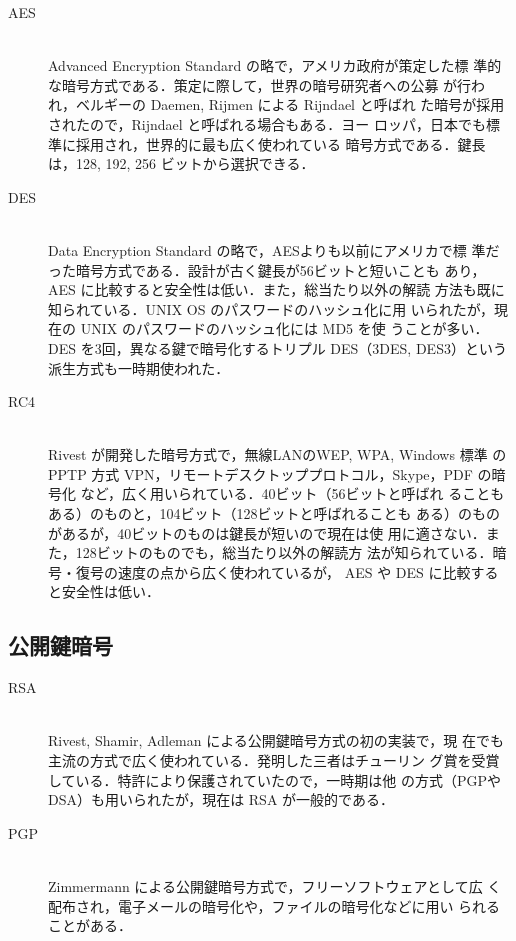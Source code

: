 \begin{description}
 \item[AES] \ \\
            Advanced Encryption Standard の略で，アメリカ政府が策定した標
	    準的な暗号方式である．策定に際して，世界の暗号研究者への公募
	    が行われ，ベルギーの Daemen, Rijmen による Rijndael と呼ばれ
	    た暗号が採用されたので，Rijndael と呼ばれる場合もある．ヨー
	    ロッパ，日本でも標準に採用され，世界的に最も広く使われている
	    暗号方式である．鍵長は，128, 192, 256 ビットから選択できる．
 \item[DES] \ \\
            Data Encryption Standard の略で，AESよりも以前にアメリカで標
	    準だった暗号方式である．設計が古く鍵長が56ビットと短いことも
	    あり，AES に比較すると安全性は低い．また，総当たり以外の解読
	    方法も既に知られている．UNIX OS のパスワードのハッシュ化に用
	    いられたが，現在の UNIX のパスワードのハッシュ化には MD5 を使
	    うことが多い．DES を3回，異なる鍵で暗号化するトリプル
	    DES（3DES, DES3）という派生方式も一時期使われた．
 \item[RC4] \ \\
            Rivest が開発した暗号方式で，無線LANのWEP, WPA, Windows 標準
	    の PPTP 方式 VPN，リモートデスクトッププロトコル，Skype，PDF
	    の暗号化 など，広く用いられている．40ビット（56ビットと呼ばれ
	    ることもある）のものと，104ビット（128ビットと呼ばれることも
	    ある）のものがあるが，40ビットのものは鍵長が短いので現在は使
	    用に適さない．また，128ビットのものでも，総当たり以外の解読方
	    法が知られている．暗号・復号の速度の点から広く使われているが，
	    AES や DES に比較すると安全性は低い．
\end{description}

\subsection{公開鍵暗号}

\begin{description}
 \item[RSA] \ \\
            Rivest, Shamir, Adleman による公開鍵暗号方式の初の実装で，現
	    在でも主流の方式で広く使われている．発明した三者はチューリン
	    グ賞を受賞している．特許により保護されていたので，一時期は他
	    の方式（PGPやDSA）も用いられたが，現在は RSA が一般的である．
 \item[PGP] \ \\
            Zimmermann による公開鍵暗号方式で，フリーソフトウェアとして広
	    く配布され，電子メールの暗号化や，ファイルの暗号化などに用い
	    られることがある．
\end{description}


